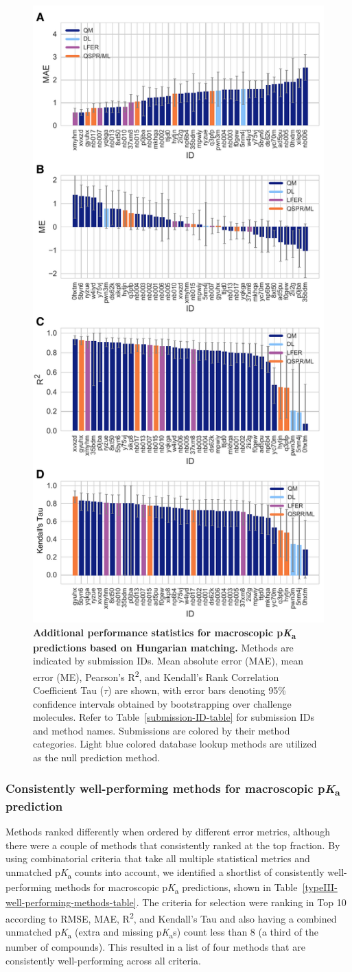 \documentclass[9pt,lineno,final]{elife}
\newcommand{\pKa}{p\textit{K}\textsubscript{a}}
\begin{document}
\begin{figure}[ht!]
\centering
\includegraphics[width=0.5\linewidth]{figures/typeIII_statistics.pdf}
\caption{{\bf Additional performance statistics for macroscopic \pKa{} predictions based on Hungarian matching.} 
Methods are indicated by submission IDs. 
Mean absolute error (MAE), mean error (ME), Pearson’s R\textsuperscript{2}, and Kendall’s Rank Correlation Coefficient Tau ($\tau$) are shown, with error bars denoting 95\% confidence intervals obtained by bootstrapping over challenge molecules. Refer to Table~\ref{submission-ID-table} for submission IDs and method names. Submissions are colored by their method categories. Light blue colored database lookup methods are utilized as the null prediction method.
}
\label{fig:typeIII-statistics}
\end{figure}


\subsubsection{Consistently well-performing methods for macroscopic \pKa{} prediction}

Methods ranked differently when ordered by different error metrics, although there were a couple of methods that consistently ranked at the top fraction. 
By using combinatorial criteria that take all multiple statistical metrics and unmatched \pKa{} counts into account, we identified a shortlist of consistently well-performing methods for macroscopic \pKa{} predictions, shown in Table~\ref{typeIII-well-performing-methods-table}. 
The criteria for selection were ranking in Top 10 according to RMSE, MAE, R\textsuperscript{2}, and Kendall's Tau and also having a combined unmatched \pKa{} (extra and missing \pKa{}s) count less than 8 (a third of the number of compounds).
This resulted in a list of four methods that are consistently well-performing across all criteria.
\end{document}
